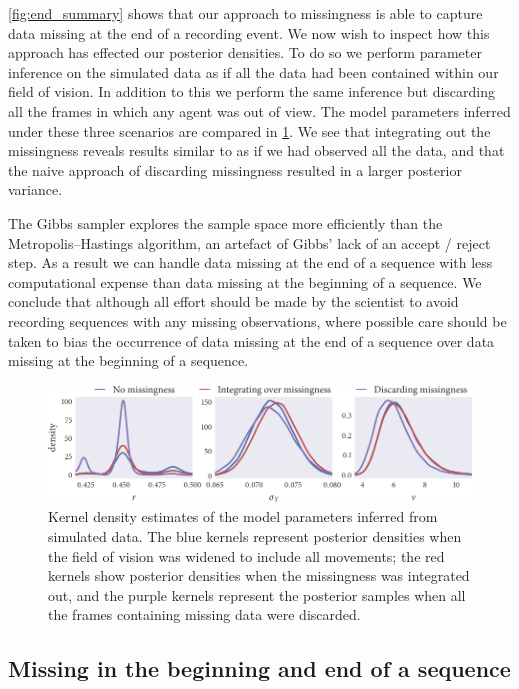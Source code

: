\cref{fig:end_summary} shows that our approach to missingness is able to
capture data missing at the end of a recording event. We now wish to inspect
how this approach has effected our posterior densities. To do so we perform
parameter inference on the simulated data as if all the data had been contained
within our field of vision. In addition to this we perform the same inference
but discarding all the frames in which any agent was out of view. The model
parameters inferred under these three scenarios are compared in
\cref{fig:end_compare}. We see that integrating out the missingness reveals
results similar to as if we had observed all the data, and that the naive
approach of discarding missingness resulted in a larger posterior variance.

The Gibbs sampler explores the sample space more efficiently than the
Metropolis--Hastings algorithm, an artefact of Gibbs' lack of an accept / reject
step. As a result we can handle data missing at the end of a sequence with
less computational expense than data missing at the beginning of a sequence.
We conclude that although all effort should be made by the scientist to avoid
recording sequences with any missing observations, where possible care should
be taken to bias the occurrence of data missing at the end of a sequence over
data missing at the beginning of a sequence.

\begin{figure}
  \includegraphics{end/compare_params.pdf}
  \caption{Kernel density estimates of the model parameters inferred from
  simulated data. The blue kernels represent posterior densities when the
  field of vision was widened to include all movements; the red kernels
  show posterior densities when the missingness was integrated out, and the
  purple kernels represent the posterior samples when all the frames
  containing missing data were discarded.}
  \label{fig:end_compare}
\end{figure}

\subsection{Missing in the beginning and end of a sequence}

